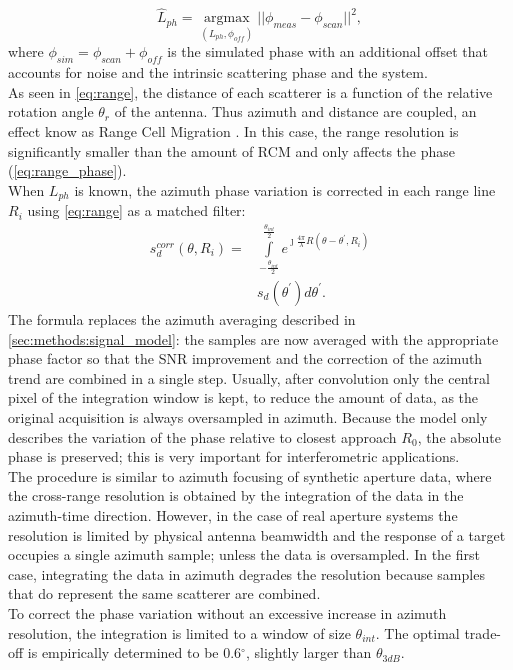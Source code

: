 \begin{equation}\label{eq:rph_estimation}
	\hat{L}_{ph} = \underset{\left(L_{ph}, \phi_{off}\right)}{\operatorname{argmax}}{\vert\vert\phi_{meas} - \phi_{scan}\vert\vert}^2,
\end{equation}
where $\phi_{sim} = \phi_{scan} + \phi_{off}$ is the simulated phase with an additional offset that accounts for noise and the intrinsic scattering phase and the system.\\
As seen in \autoref{eq:range}, the distance of each scatterer is a function of the relative rotation angle $\theta_r$ of the antenna. Thus azimuth and distance are coupled, an effect know as Range Cell Migration . In this case, the range resolution is significantly smaller than the amount of RCM and only affects the phase (\autoref{eq:range_phase}).\\
When $L_{ph}$ is known, the azimuth phase variation is corrected in each range line $R_{i}$ using \autoref{eq:range} as a matched filter:
\begin{equation}\label{eq:correction}
	\begin{aligned}
		s_{d}^{corr}\left(\theta, R_{i}\right) = &\int\limits_{-\frac{\theta_{int}}{2}}^{\frac{\theta_{int}}{2}}e^{\jmath \frac{4\pi}{\lambda}R\left(\theta - \theta^{\prime}, R_{i}\right)}\\
		&s_{d}\left(\theta^\prime\right) d\theta^\prime.
	\end{aligned}
\end{equation}
The formula replaces the azimuth averaging described in \autoref{sec:methods:signal_model}: the samples are now averaged with the appropriate phase factor so that the SNR improvement and the correction of the azimuth trend are combined in a single step. Usually, after convolution only the central pixel of the integration window is kept, to reduce the amount of data, as the original acquisition is always oversampled in azimuth. Because the model only describes the variation of the phase relative to closest approach $R_{0}$, the absolute phase is preserved; this is very important for interferometric applications.\\
The procedure is similar to azimuth focusing of synthetic aperture data, where the cross-range resolution is obtained by the integration of the data in the azimuth-time direction. However, in the case of real aperture systems the resolution is limited by physical antenna beamwidth and the response of a target  occupies a single azimuth sample; unless the data is oversampled. In the first case, integrating the data in azimuth degrades the resolution because samples that do represent the same scatterer are combined.\\ To correct the phase variation without an excessive increase in azimuth resolution, the integration is limited to a window of size $\theta_{int}$. The optimal trade-off is empirically determined to be 0.6$^\circ$, slightly larger than $\theta_{3dB}$.
